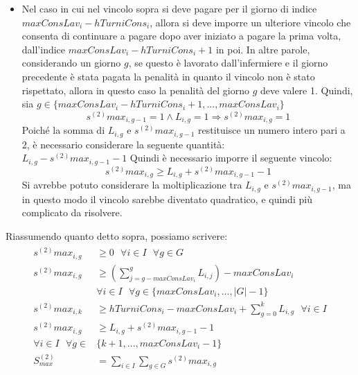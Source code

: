 \begin{itemize}
\item Nel caso in cui nel vincolo sopra si deve pagare per il giorno di indice $maxConsLav_i - hTurniCons_i$, allora si deve imporre un ulteriore vincolo che consenta di continuare a pagare dopo aver iniziato a pagare la prima volta, dall'indice $maxConsLav_i - hTurniCons_i + 1$ in poi.
In altre parole, considerando un giorno $g$, se questo è lavorato dall'infermiere e il giorno precedente è stata pagata la penalità in quanto il vincolo non è stato rispettato, allora in questo caso la penalità del giorno $g$ deve valere 1.
Quindi, sia $g \in \{maxConsLav_i - hTurniCons_i + 1,...,maxConsLav_i\}$
\begin{equation}
s^{(2)}max_{i, g-1} = 1 \wedge L_{i, g} = 1 \Longrightarrow s^{(2)}max_{i, g} = 1
\end{equation}
Poiché la somma di $L_{i, g}$ e $s^{(2)}max_{i, g-1}$ restituisce un numero intero pari a 2, è necessario considerare la seguente quantità:\\
$L_{i, g} - s^{(2)}max_{i, g-1} - 1$
Quindi è necessario imporre il seguente vincolo:
\begin{equation}
s^{(2)}max_{i, g} \geq L_{i, g} + s^{(2)}max_{i, g-1} - 1
\end{equation}
Si avrebbe potuto considerare la moltiplicazione tra $L_{i, g}$ e $s^{(2)}max_{i, g-1}$, ma in questo modo il vincolo sarebbe diventato quadratico, e quindi più complicato da risolvere.
\end{itemize}

Riassumendo quanto detto sopra, possiamo scrivere:
\begin{gather}
\begin{aligned}
s^{(2)}max_{i, g} &\geq 0 ~~~ \forall i \in I ~~~ \forall g \in G \\
s^{(2)}max_{i, g} &\geq (\sum_{j=g - maxConsLav_i}^{g} L_{i, j}) - maxConsLav_i  \\
& \forall i \in I ~~~ \forall g \in \{maxConsLav_i,...,|G| - 1\} \\
s^{(2)}max_{i, k} &\geq hTurniCons_i - maxConsLav_i + \sum_{g = 0}^{k} L_{i, g} ~~~ \forall i \in I \\
s^{(2)}max_{i, g} &\geq L_{i, g} + s^{(2)}max_{i, g-1} - 1\\ 
\forall i \in I ~~~ \forall g \in &\{k + 1,...,maxConsLav_i - 1\} \\
S^{(2)}_{max} &= \sum_{i \in I} \sum_{g \in G} s^{(2)}max_{i, g} \\
\end{aligned}
\end{gather}


